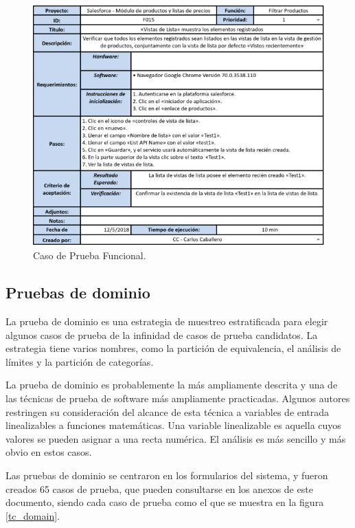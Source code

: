 \begin{figure}
\centering
\includegraphics[width=1.0\textwidth]{graphics/tc2-functional.eps}
\caption{Caso de Prueba Funcional.}
\label{tc_functional}
\end{figure}

\subsection{Pruebas de dominio}
La prueba de dominio es una estrategia de muestreo estratificada para elegir
algunos casos de prueba de la infinidad de casos de prueba candidatos. La
estrategia tiene varios nombres, como la partición de equivalencia, el análisis
de límites y la partición de categorías.

La prueba de dominio es probablemente la más ampliamente descrita y una de las
técnicas de prueba de software más ampliamente practicadas. Algunos autores
restringen su consideración del alcance de esta técnica a variables de entrada
linealizables a funciones matemáticas. Una variable linealizable es aquella
cuyos valores se pueden asignar a una recta numérica. El análisis es más
sencillo y más obvio en estos casos\cite{Kaner}.

Las pruebas de dominio se centraron en los formularios del sistema, y fueron
creados 65 casos de prueba, que pueden consultarse en los anexos de este
documento, siendo cada caso de prueba como el que se muestra en la figura
\ref{tc_domain}.

